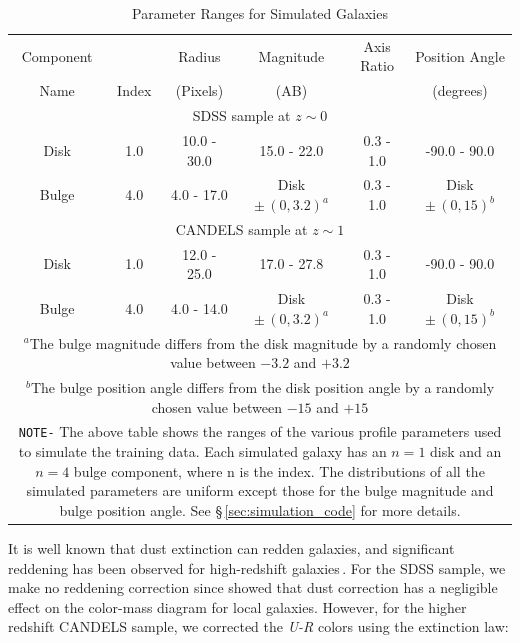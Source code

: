 \begin{table}[htbp]
\centering
\caption{Parameter Ranges for Simulated Galaxies  \label{tab:sim_para}}
\begin{tabular}{cccccc}
\hline
\hline
Component& \sersic{} & Radius & Magnitude & Axis Ratio & Position Angle \\ 
Name & Index & (Pixels) & (AB) &  & (degrees) \\
\hline
\hline
\multicolumn{6}{c}{SDSS sample at $z \sim 0$} \\
    \hline
    Disk & 1.0 & 10.0 - 30.0 & 15.0 - 22.0 & 0.3 - 1.0 & -90.0 - 90.0 \\
    Bulge & 4.0 & 4.0 - 17.0 & Disk $\pm\,(0,3.2)^{a}$ & 0.3 - 1.0 & Disk $\pm\,(0,15)^{b}$\\
    \hline
    \hline
    \multicolumn{6}{c}{CANDELS sample at $z \sim 1$} \\
    \hline
    Disk & 1.0 & 12.0 - 25.0 & 17.0 - 27.8 & 0.3 - 1.0 & -90.0 - 90.0\\
    Bulge & 4.0 & 4.0 - 14.0 & Disk $\pm\,(0,3.2)^{a}$ & 0.3 - 1.0 &  Disk $\pm\,(0,15)^{b}$ \\
    \hline
    \multicolumn{6}{p{0.9\textwidth}}{\vskip 0.01cm \small $^a$The bulge magnitude differs from the disk magnitude by a randomly chosen value between $-3.2$ and $+3.2$}\\
    \multicolumn{6}{p{0.9\textwidth}}{\small$^b$The bulge position angle differs from the disk position angle by a randomly chosen value between $-15$ and $+15$}\\
    \multicolumn{6}{p{0.9\textwidth}}{\small \texttt{NOTE-} The above table shows the ranges of the various \sersic{} profile parameters used to simulate the training data. Each simulated galaxy has an $n=1$ disk and an $n = 4 $ bulge component, where n is the \sersic{} index. The distributions of all the simulated parameters are uniform except those for the bulge magnitude and bulge position angle. See \S\,\ref{sec:simulation_code} for more details.}\\
\end{tabular}
\end{table}


It is well known that dust extinction can redden galaxies, and significant reddening has been observed for high-redshift galaxies\,\citep{brammer_09,williams_09,cardamone_10}. For the SDSS sample, we make no reddening correction since \citet{Schawinski2014TheGalaxies} showed that dust correction has a negligible effect on the color-mass diagram for local galaxies. However, for the higher redshift CANDELS sample, we corrected the \textit{U-R} colors using the \citet{calzetti_00} extinction law:

